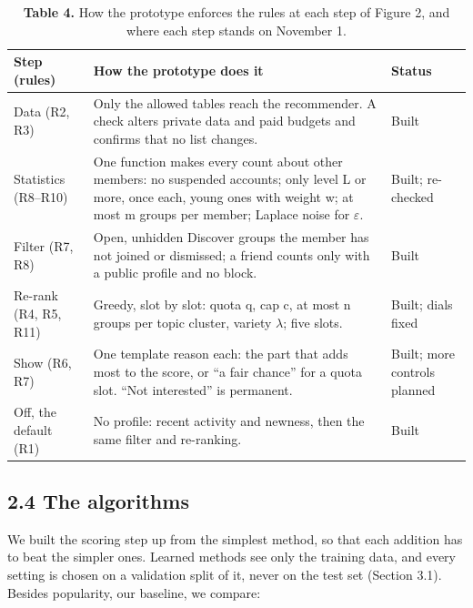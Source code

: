 \documentclass[11pt,letterpaper]{article}
\newcommand{\rowrule}{\midrule[0.2pt]}
\begin{document}
\begin{table}[!htbp]
\centering
\caption*{\textbf{Table 4.} How the prototype enforces the rules at each step of Figure 2, and where each step
stands on November 1.}
\scriptsize
\begin{tabular}{
  >{\raggedright\arraybackslash}p{}
  >{\raggedright\arraybackslash}p{}
  >{\raggedright\arraybackslash}p{}
}
\toprule
\textbf{Step (rules)} & \textbf{How the prototype does it} & \textbf{Status} \\
\midrule
Data (R2, R3) & Only the allowed tables reach the recommender. A check alters private data and paid budgets and confirms that no list changes. & Built \\
\rowrule
Statistics (R8--R10) & One function makes every count about other members: no suspended accounts; only level L or more, once each, young ones with weight w; at most m groups per member; Laplace noise for $\varepsilon$. & Built; re-checked \\
\rowrule
Filter (R7, R8) & Open, unhidden Discover groups the member has not joined or dismissed; a friend counts only with a public profile and no block. & Built \\
\rowrule
Re-rank (R4, R5, R11) & Greedy, slot by slot: quota q, cap c, at most n groups per topic cluster, variety $\lambda$; five slots. & Built; dials fixed \\
\rowrule
Show (R6, R7) & One template reason each: the part that adds most to the score, or ``a fair chance'' for a quota slot. ``Not interested'' is permanent. & Built; more controls planned \\
\rowrule
Off, the default (R1) & No profile: recent activity and newness, then the same filter and re-ranking. & Built \\
\bottomrule
\end{tabular}
\end{table}

\subsection{2.4 The algorithms}

We built the scoring step up from the simplest method, so that each addition has to beat the simpler ones.
Learned methods see only the training data, and every setting is chosen on a validation split of it, never on
the test set (Section 3.1). Besides popularity, our baseline, we compare:
\end{document}
